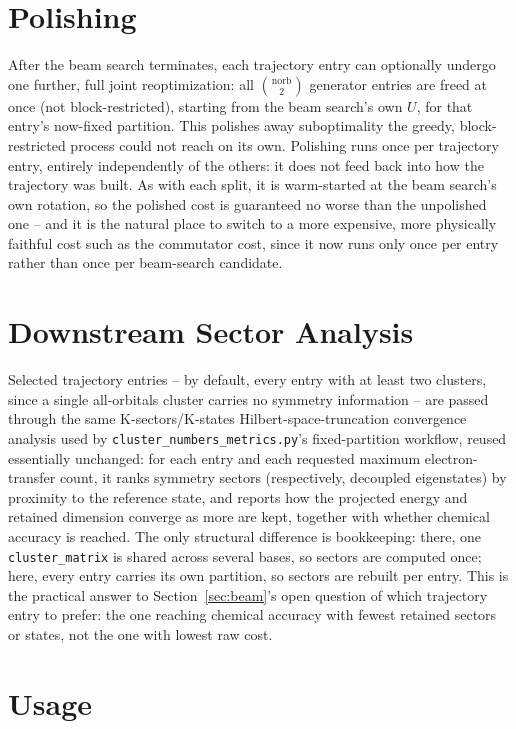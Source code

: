 \documentclass[10pt]{article}
\begin{document}
\section{Polishing}
\label{sec:polish}

After the beam search terminates, each trajectory entry can optionally undergo one further, full
joint reoptimization: all $\binom{\mathrm{norb}}{2}$ generator entries are freed at once (not
block-restricted), starting from the beam search's own $U$, for that entry's now-fixed
partition. This polishes away suboptimality the greedy, block-restricted process could not reach
on its own. Polishing runs once per trajectory entry, entirely independently of the others: it
does not feed back into how the trajectory was built. As with each split, it is warm-started at
the beam search's own rotation, so the polished cost is guaranteed no worse than the unpolished
one -- and it is the natural place to switch to a more expensive, more physically faithful cost
such as the commutator cost, since it now runs only once per entry rather than once per
beam-search candidate.

\section{Downstream Sector Analysis}
\label{sec:sectors}

Selected trajectory entries -- by default, every entry with at least two clusters, since a
single all-orbitals cluster carries no symmetry information -- are passed through the same
K-sectors/K-states Hilbert-space-truncation convergence analysis used by
\texttt{cluster\_numbers\_metrics.py}'s fixed-partition workflow, reused essentially unchanged:
for each entry and each requested maximum electron-transfer count, it ranks symmetry sectors
(respectively, decoupled eigenstates) by proximity to the reference state, and reports how the
projected energy and retained dimension converge as more are kept, together with whether
chemical accuracy is reached. The only structural difference is bookkeeping: there, one
\texttt{cluster\_matrix} is shared across several bases, so sectors are computed once; here,
every entry carries its own partition, so sectors are rebuilt per entry. This is the practical
answer to Section~\ref{sec:beam}'s open question of which trajectory entry to prefer: the one
reaching chemical accuracy with fewest retained sectors or states, not the one with lowest raw
cost.

\section{Usage}
\label{sec:usage}
\end{document}
